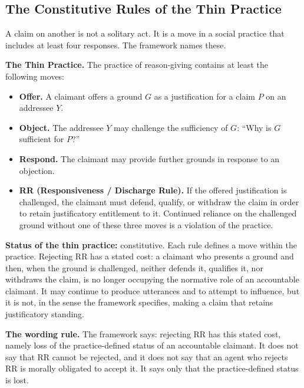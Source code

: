 \documentclass[11pt]{article}
\begin{document}
\subsection{The Constitutive Rules of the Thin Practice}
A claim on another is not a solitary act. It is a move in a social practice that includes at least four responses. The framework names these.
\begin{paperbox}
\textbf{The Thin Practice.} The practice of reason-giving contains at least the following moves:
\begin{itemize}
\item \textbf{Offer.} A claimant offers a ground $G$ as a justification for a claim $P$ on an addressee $Y$.
\item \textbf{Object.} The addressee $Y$ may challenge the sufficiency of $G$: ``Why is $G$ sufficient for $P$?''
\item \textbf{Respond.} The claimant may provide further grounds in response to an objection.
\item \textbf{RR (Responsiveness / Discharge Rule).} If the offered justification is challenged, the claimant must defend, qualify, or withdraw the claim in order to retain justificatory entitlement to it. Continued reliance on the challenged ground without one of these three moves is a violation of the practice.
\end{itemize}
\end{paperbox}

\textbf{Status of the thin practice:} constitutive. Each rule defines a move within the practice. Rejecting RR has a stated cost: a claimant who presents a ground and then, when the ground is challenged, neither defends it, qualifies it, nor withdraws the claim, is no longer occupying the normative role of an accountable claimant. It may continue to produce utterances and to attempt to influence, but it is not, in the sense the framework specifies, making a claim that retains justificatory standing.

\textbf{The wording rule.} The framework says: rejecting RR has this stated cost, namely loss of the practice-defined status of an accountable claimant. It does not say that RR cannot be rejected, and it does not say that an agent who rejects RR is morally obligated to accept it. It says only that the practice-defined status is lost.
\end{document}
